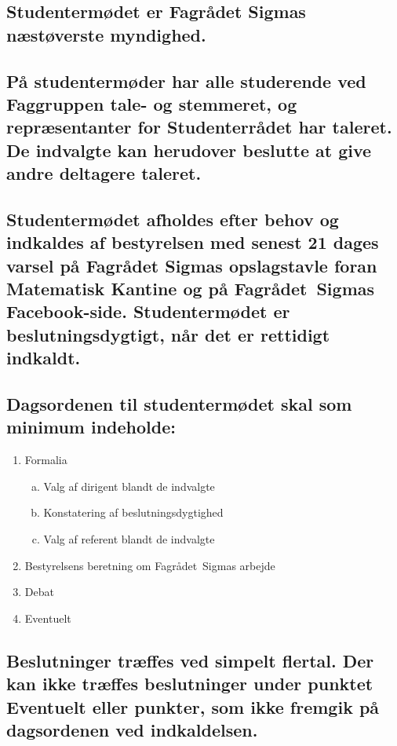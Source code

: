 \documentclass[10pt, danish]{article}
\newcommand{\fagr}{Fagrådet~Sigma}
\begin{document}
	\subsection{Studentermødet er Fagrådet Sigmas næstøverste myndighed.}
	
	\subsection{På studentermøder har alle studerende ved Faggruppen tale- og stemmeret, og repræsentanter for Studenterrådet har taleret. De indvalgte kan herudover beslutte at give andre deltagere taleret.}
	
	\subsection{Studentermødet afholdes efter behov og indkaldes af bestyrelsen med senest 21 dages varsel på Fagrådet Sigmas opslagstavle foran Matematisk Kantine og på \fagr{}s Facebook-side. Studentermødet er beslutningsdygtigt, når det er rettidigt indkaldt.}
	
	\subsection{Dagsordenen til studentermødet skal som minimum indeholde:}
	
	\begin{enumerate}[1), nosep]
		\item Formalia
		\begin{enumerate}[a., nosep]
			\item Valg af dirigent blandt de indvalgte
			\item Konstatering af beslutningsdygtighed
			\item Valg af referent blandt de indvalgte
		\end{enumerate}
		\item Bestyrelsens beretning om \fagr{}s arbejde
		\item Debat
		\item Eventuelt
	\end{enumerate}
	
	\subsection{Beslutninger træffes ved simpelt flertal. Der kan ikke træffes beslutninger under punktet Eventuelt eller punkter, som ikke fremgik på dagsordenen ved indkaldelsen.}\label{FRM:flertal}
	
\end{document}
